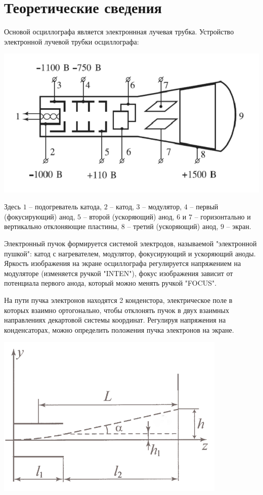 \documentclass[a4paper, 12pt]{article} %
\begin{document}
\section{Теоретические сведения}

Основой осциллографа является электроннная лучевая трубка. Устройство электронной лучевой трубки осциллографа:

\begin{center}
    \includegraphics[width=\textwidth]{1}
\end{center}

Здесь $1$ -- подогреватель катода, $2$ -- катод, $3$ -- модулятор, $4$ -- первый (фокусирующий)
анод, $5$ -- второй (ускоряющий) анод, $6$ и $7$ -- горизонтально и вертикально отклоняющие
пластины, $8$ -- третий (ускоряющий) анод, $9$ -- экран.

Электронный пучок формируется системой электродов, называемой "электронной пушкой": катод с нагревателем, модулятор, фокусирующий и ускоряющий аноды. Яркость изображения на экране осциллографа регулируется напряжением на модуляторе (изменяется ручкой "INTEN"), фокус изображения зависит от потенциала первого анода, который можно менять ручкой "FOCUS".

На пути пучка электронов находятся 2 конденстора, электрическое поле в которых взаимно ортогонально, чтобы отклонять пучок в двух взаимных направлениях декартовой системы координат. Регулируя напряжения на конденсаторах, можно определить положения пучка электронов на экране.

\begin{center}
    \includegraphics[width=11cm]{2}
\end{center}
\end{document}
